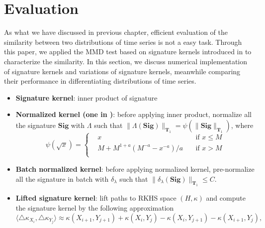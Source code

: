\documentclass[12pt]{report}
\theoremstyle{definition}
\theoremstyle{remark}
\begin{document}
\section{Evaluation}
As what we have discussed in previous chapter, efficient evaluation of the similarity between two distributions of time series is not a easy task. Through this paper, we applied the MMD test based on signature kernels introduced in \cite{chevyrev2018signature} to characterize the similarity. In this section, we discuss numerical implementation of signature kernels and variations of signature kernels, meanwhile comparing their performance in differentiating distributions of time series. 
\begin{itemize}
     \item \textbf{Signature kernel}: inner product of signature 
     \item \textbf{Normalized kernel (one in \cite{chevyrev2018signature})}: before applying inner product, normalize all the signature $\mathbf{Sig}$ with $\Lambda$ such that $\lVert \Lambda(\mathbf{Sig})\rVert_{\mathbf{T}_{1}} = \psi(\lVert \mathbf{Sig}\rVert_{\mathbf{T}_{1}})$, where 
     \begin{equation*}
       \psi(\sqrt{x}) = \left\{\begin{aligned}
         &x  &\text{if } x\leq M\\
         &M + M^{1+a}(M^{-a} - x^{-a})/a\quad &\text{if } x> M\\
       \end{aligned}\right.
     \end{equation*}
     \item \textbf{Batch normalized kernel}: before applying normalized kernel, pre-normalize all the signature in batch with $\delta_{\lambda}$ such that $\lVert \delta_{\lambda}(\mathbf{Sig})\rVert_{\mathbf{T}_{1}} \leq C$.
     \item \textbf{Lifted signature kernel}: lift paths to RKHS space $(H,\kappa)$ and compute the signature kernel by the following approximation
     \begin{equation}\label{approkernel}
      \langle\triangle\kappa_{X_{i}}, \triangle\kappa_{Y_{j}}\rangle\approx\kappa(X_{i+1},Y_{j+1}) + \kappa(X_{i},Y_{j}) - \kappa(X_{i},Y_{j+1}) - \kappa(X_{i+1},Y_{j}),
    \end{equation}
\end{itemize}
\end{document}
